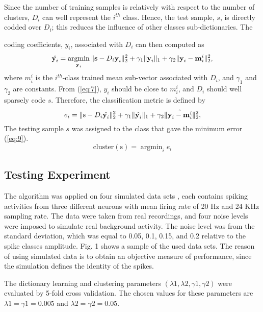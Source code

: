 \documentclass[conference]{IEEEtran}
\DeclareMathOperator*{\argmin}{argmin}
\begin{document}
	Since the number of training samples is relatively with respect to the number of clusters, $D_i$ can well represent the $i^{th}$ class. Hence, the test sample, $s$, is directly codded over $D_i$; this reduces the influence of other classes sub-dictionaries. The
	
	 
	coding coefficients, $y_i$, associated with $D_i$ can then computed as
	\begin{equation}
		\label{eq:7}
		\hat{\textbf{y}_i}=\argmin_{\textbf{y}_i}\paralleled{\textbf{s}-D_i\textbf{y}_i}_2^2+\gamma_1\paralleled{\textbf{y}_i}_1+\gamma_2\paralleled{\textbf{y}_i-\textbf{m}_i^i}_2^2,
	\end{equation}
	where $m_i^i$ is the $i^{th}$-class trained mean sub-vector associated with $D_i$, and $\gamma_1$ and $\gamma_2$ are constants. From (\ref{eq:7}), $y_i$ should be close to $m_i^i$, and $D_i$ should well sparsely code $s$. Therefore, the classification metric is defined by
	\begin{equation}
		\label{eq:8}
		e_i=\Vert{\text{s}-D_i\hat{\textbf{y}_i}}\Vert_2^2+\gamma_1\Vert{\hat{\textbf{y}_i}}\Vert_1+\gamma_2\Vert{\hat{\textbf{y}_i-\textbf{m}_i^i}}\Vert_2^2,
	\end{equation}
	The testing sample $s$ was assigned to the class that gave the minimum error (\ref{eq:9}).
	\begin{equation}
		\label{eq:9}
		\mathrm{cluster(s)}=\argmin_ie_i
	\end{equation}
	
	\subsection{Testing Experiment}
	The algorithm was applied on four simulated data sets \cite{quiroga2004unsupervised}, each contains spiking activities from three different neurons with mean firing rate of 20 Hz and 24 KHz sampling rate. The data were taken from real recordings, and four noise levels were imposed to simulate real background activity. The noise level was from the standard deviation, which was equal to 0.05, 0.1, 0.15, and 0.2 relative to the spike classes amplitude. Fig. 1 shows a sample of the used data sets. The reason of using simulated data is to obtain an objective measure of performance, since the simulation defines the identity of the spikes.
	
	The dictionary learning and clustering parameters
	$(\lambda1, \lambda2, \gamma1, \gamma2)$ were evaluated by 5-fold cross validation. The chosen values for these parameters are $\lambda1 = \gamma1 = 0.005$ and $\lambda2 = \gamma2 = 0.05$.
	
\end{document}

